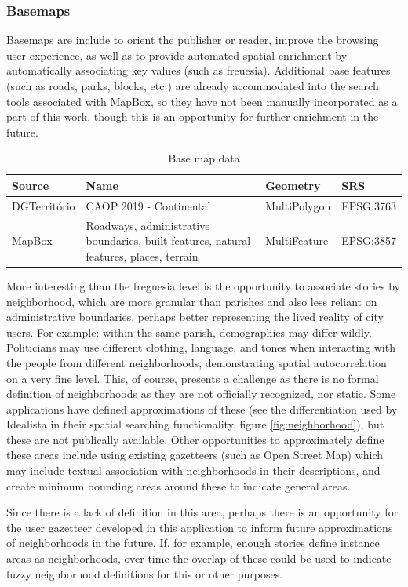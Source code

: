 \subsubsection{Basemaps}
Basemaps are include to orient the publisher or reader, improve the browsing user experience, as well as to provide automated spatial enrichment by automatically associating key values (such as freuesia). Additional base features (such as roads, parks, blocks, etc.) are already accommodated into the search tools associated with MapBox, so they have not been manually incorporated as a part of this work, though this is an opportunity for further enrichment in the future. 
\begin{table} [H]
		\centering
		\begin{tabular}{| l p{5cm} l  l |}
			\hline
			Source & Name & Geometry & SRS \\ 
			\hline \hline
			DGTerritório & CAOP 2019 - Continental & MultiPolygon & EPSG:3763 \\
			\hline
			MapBox & Roadways, administrative boundaries, built features, natural features, places, terrain & MultiFeature & EPSG:3857\\
			\hline
		\end{tabular}
		\caption{Base map data}
		\label{table:data_basemaps}
\end{table}
More interesting than the freguesia level is the opportunity to associate stories by neighborhood, which are more granular than parishes and also less reliant on administrative boundaries, perhaps better representing the lived reality of city users. For example: within the same parish, demographics may differ wildly. Politicians may use different clothing, language, and tones when interacting with the people from different neighborhoods, demonstrating spatial autocorrelation on a very fine level. This, of course, presents a challenge as there is no formal definition of neighborhoods as they are not officially recognized, nor static. Some applications have defined approximations of these (see the differentiation used by Idealista in their spatial searching functionality, figure \ref{fig:neighborhood}), but these are not publically available. Other opportunities to approximately define these areas include using existing gazetteers (such as Open Street Map) which may include textual association with neighborhoods in their descriptions, and create minimum bounding areas around these to indicate general areas.

Since there is a lack of definition in this area, perhaps there is an opportunity for the user gazetteer developed in this application to inform future approximations of neighborhoods in the future. If, for example, enough stories define instance areas as neighborhoods, over time the overlap of these could be used to indicate fuzzy neighborhood definitions for this or other purposes.

